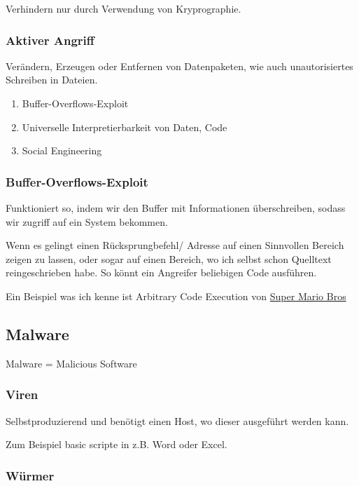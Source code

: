 \documentclass[a4paper]{article}
\begin{document}
Verhindern nur durch Verwendung von Kryprographie.

\subsubsection{Aktiver Angriff}

Verändern, Erzeugen oder Entfernen von Datenpaketen, wie auch unautorisiertes Schreiben in Dateien.

\begin{enumerate}
    \item Buffer-Overflows-Exploit
    \item Universelle Interpretierbarkeit von Daten, Code
    \item Social Engineering
\end{enumerate}

\subsubsection{Buffer-Overflows-Exploit}

Funktioniert so, indem wir den Buffer mit Informationen überschreiben, sodass wir zugriff auf ein System bekommen.

Wenn es gelingt einen Rücksprungbefehl/ Adresse auf einen Sinnvollen Bereich zeigen zu lassen, oder sogar auf einen Bereich, wo ich selbst schon Quelltext reingeschrieben habe. So könnt ein Angreifer beliebigen Code ausführen.

Ein Beispiel was ich kenne ist Arbitrary Code Execution von \href{https://tasvideos.org/8991S}{Super Mario Bros}

\subsection{Malware}

Malware = Malicious Software

\subsubsection{Viren}

Selbstproduzierend und benötigt einen Host, wo dieser ausgeführt werden kann.

Zum Beispiel basic scripte in z.B. Word oder Excel.

\subsubsection{Würmer}
\end{document}
